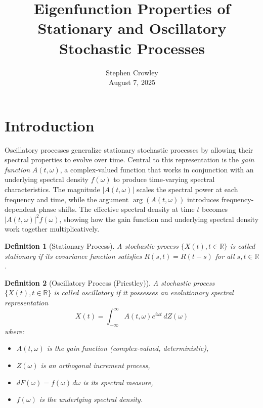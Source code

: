 \documentclass{article}
\newcommand{\tmaffiliation}[1]{\\ #1}
\newcommand{\tmem}[1]{{\em #1\/}}
\newtheorem{definition}{Definition}
\begin{document}
\title{Eigenfunction Properties of Stationary and Oscillatory Stochastic
Processes}

\author{
  Stephen Crowley
  \tmaffiliation{August 7, 2025}
}

\date{}

\maketitle

\section*{Introduction}

Oscillatory processes generalize stationary stochastic processes by allowing
their spectral properties to evolve over time. Central to this representation
is the {\tmem{gain function}} $A (t, \omega)$, a complex-valued function that
works in conjunction with an underlying spectral density $f (\omega)$ to
produce time-varying spectral characteristics. The magnitude $|A (t, \omega)
|$ scales the spectral power at each frequency and time, while the argument
$\arg (A (t, \omega))$ introduces frequency-dependent phase shifts. The
effective spectral density at time $t$ becomes $|A (t, \omega) |^2 f
(\omega)$, showing how the gain function and underlying spectral density work
together multiplicatively.

\begin{definition}
  [Stationary Process] A stochastic process $\{X (t), t \in \mathbb{R}\}$ is
  called stationary if its covariance function satisfies $R (s, t) = R (t -
  s)$ for all $s, t \in \mathbb{R}$.
\end{definition}

\begin{definition}
  [Oscillatory Process (Priestley)] A stochastic process $\{X (t), t \in
  \mathbb{R}\}$ is called oscillatory if it possesses an evolutionary spectral
  representation
  \begin{equation}
    X (t) = \int_{- \infty}^{\infty} A (t, \omega) e^{i \omega t} \, dZ (\omega)
  \end{equation}
  where:
  \begin{itemize}
  \item $A (t, \omega)$ is the gain function (complex-valued, deterministic),
  \item $Z (\omega)$ is an orthogonal increment process,
  \item $dF (\omega) = f (\omega) \, d \omega$ is its spectral measure,
  \item $f (\omega)$ is the underlying spectral density.
  \end{itemize}
\end{definition}
\end{document}
